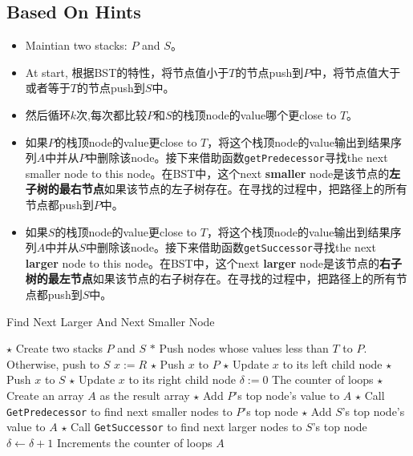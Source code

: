 \subsection{Based On Hints}
\begin{itemize}
\item Maintian two stacks: $P$ and $S$。
\item At start, 根据BST的特性，将节点值小于$T$的节点push到$P$中，将节点值大于或者等于$T$的节点push到$S$中。
\item 然后循环$k$次,每次都比较$P$和$S$的栈顶node的value哪个更close to $T$。
\item 如果$P$的栈顶node的value更close to $T$，将这个栈顶node的value输出到结果序列$A$中并从$P$中删除该node。接下来借助函数\texttt{getPredecessor}寻找the next smaller node to this node。在BST中，这个next \textbf{smaller} node是该节点的\textbf{左子树的最右节点}如果该节点的左子树存在。在寻找的过程中，把路径上的所有节点都push到$P$中。
\item 如果$S$的栈顶node的value更close to $T$，将这个栈顶node的value输出到结果序列$A$中并从$S$中删除该node。接下来借助函数\texttt{getSuccessor}寻找the next \textbf{larger} node to this node。在BST中，这个next \textbf{larger} node是该节点的\textbf{右子树的最左节点}如果该节点的右子树存在。在寻找的过程中，把路径上的所有节点都push到$S$中。
\end{itemize}
\begin{algorithm}[H]
\caption{Find Next Larger And Next Smaller Node}
\begin{algorithmic}[1]
\State $\star$ Create two stacks $P$ and $S$
\State $\ast$ Push nodes whose values less than $T$ to $P$. Otherwise, push to $S$
\State $x:=R$
\State $\star$ Push $x$ to $P$
\State $\star$ Update $x$ to its left child node
\Else
\State $\star$ Push $x$ to $S$
\State $\star$ Update $x$ to its right child node
\EndIf
\EndWhile
\State $\delta:=0$ \Comment The counter of loops
\State $\star$ Create an array $A$ as the result array
\State $\star$ Add $P$'s top node's value to $A$
\State $\star$ Call \texttt{GetPredecessor} to find next smaller nodes to $P$'s top node
\Else
\State $\star$ Add $S$'s top node's value to $A$
\State $\star$ Call \texttt{GetSuccessor} to find next larger nodes to $S$'s top node
\EndIf
\State $\delta\gets\delta+1$ \Comment Increments the counter of loops
\EndWhile
\State \Return $A$
\EndProcedure
\end{algorithmic}
\end{algorithm}
